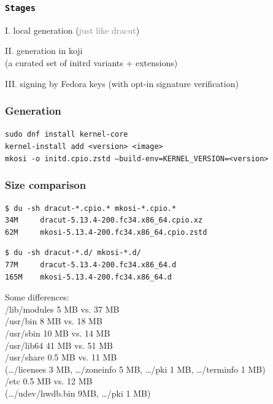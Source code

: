 \documentclass[]{beamer}
\begin{document}
\begin{frame}
  \frametitle{\texttt{Stages}}

  I. local generation (\textcolor{gray}{just like dracut})

  \pause
  II. generation in koji\\
  (a curated set of initrd variants + extensions)

  \pause
  III. signing by Fedora keys
  (with opt-in signature verification)
 \end{frame}



\begin{frame}[fragile]
  \frametitle{Generation}

  \texttt{sudo dnf install kernel-core}\\

  \texttt{kernel-install add <version> <image>}\\
  
  \texttt{mkosi -o initd.cpio.zstd --build-env=KERNEL\_VERSION=<version>}\\



\end{frame}

\begin{frame}[fragile]
  \frametitle{Size comparison}

  \begin{verbatim}
$ du -sh dracut-*.cpio.* mkosi-*.cpio.*
34M     dracut-5.13.4-200.fc34.x86_64.cpio.xz
62M     mkosi-5.13.4-200.fc34.x86_64.cpio.zstd
  \end{verbatim}
  \pause
  \begin{verbatim}
$ du -sh dracut-*.d/ mkosi-*.d/
77M     dracut-5.13.4-200.fc34.x86_64.d
165M    mkosi-5.13.4-200.fc34.x86_64.d
  \end{verbatim}

  \pause
  \bigskip

  Some differences:\\
  /lib/modules  5 MB vs. 37 MB\\
  /usr/bin      8 MB vs. 18 MB\\
  /usr/sbin    10 MB vs. 14 MB\\
  /usr/lib64   41 MB vs. 51 MB\\
  /usr/share    0.5 MB vs. 11 MB\\
  (…/licenses 3 MB, …/zoneinfo 5 MB, …/pki 1 MB, …/terminfo 1 MB)\\
  /etc          0.5 MB vs. 12 MB\\
  (…/udev/hwdb.bin 9MB, …/pki 1 MB)

\end{frame}
\end{document}
